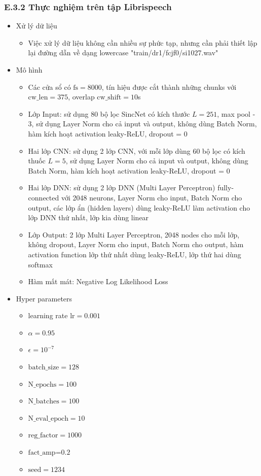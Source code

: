\documentclass{article}
\begin{document}
	\subsubsection{E.3.2 Thực nghiệm trên tập Librispeech}
	\begin{itemize}
		\item Xử lý dữ liệu
		\begin{itemize}
			\item Việc xử lý dữ liệu không cần nhiều sự phức tạp, nhưng cần phải thiết lập lại đường dẫn về dạng lowercase "train/dr1/fcjf0/si1027.wav"
		\end{itemize}
		\item Mô hình 
		\begin{itemize}
			\item Các cửa sổ có $\text{fs} = 8000$, tín hiệu được cắt thành những chunks với $\text{cw\_len}=375$, overlap $\text{cw\_shift}=10$s
			\item Lớp Input: sử dụng 80 bộ lọc SincNet có kích thước $L=251$, max pool - 3, sử dụng Layer Norm cho cả input và output, không dùng Batch Norm, hàm kích hoạt activation leaky-ReLU, dropout = 0
			\item Hai lớp CNN: sử dụng 2 lớp CNN, với mỗi lớp dùng 60 bộ lọc có kích thuốc $L=5$, sử dụng Layer Norm cho cả input và output, không dùng Batch Norm, hàm kích hoạt activation leaky-ReLU, dropout = 0
			\item Hai lớp DNN: sử dụng 2 lớp DNN (Multi Layer Perceptron) fully-connected với 2048 neurons, Layer Norm cho input, Batch Norm cho output, các lớp ẩn (hidden layers) dùng leaky-ReLU làm activation cho lớp DNN thứ nhất, lớp kia dùng linear
			\item Lớp Output: 2 lớp Multi Layer Perceptron, 2048 nodes cho mỗi lớp, không dropout, Layer Norm cho input, Batch Norm cho output, hàm activation function lớp thứ nhất dùng leaky-ReLU, lớp thứ hai dùng softmax
			\item Hàm mất mát: Negative Log Likelihood Loss
		\end{itemize}
		\item Hyper parameters
		\begin{itemize}
			\item learning rate $\text{lr} = 0.001$
			\item $\alpha = 0.95$
			\item $\epsilon = 10^{-7}$
			\item $\text{batch\_size}=128$
			\item $\text{N\_epochs}=100$
			\item $\text{N\_batches}=100$
			\item $\text{N\_eval\_epoch}=10$
			\item $\text{reg\_factor}=1000$
			\item $\text{fact\_amp=0.2}$
			\item $\text{seed}=1234$
		\end{itemize}
	\end{itemize}
\end{document}

